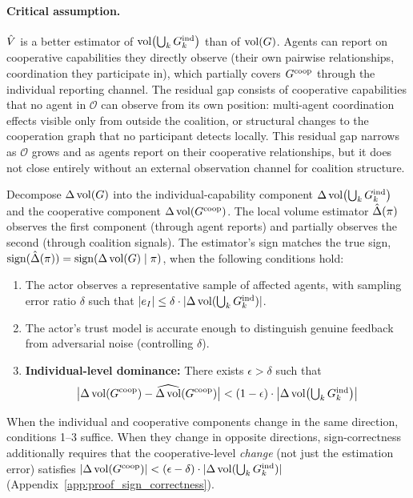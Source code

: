 \paragraph{Critical assumption.} $\hat{V}$ is a better estimator of
$\operatorname{vol}\bigl(\bigcup_k G_{k}^{\mathrm{ind}}\bigr)$ than of $\operatorname{vol}(G)$. Agents can report on
cooperative capabilities they directly observe (their own pairwise
relationships, coordination they participate in), which partially covers
$G^{\mathrm{coop}}$ through the individual reporting channel. The residual gap consists of
cooperative capabilities that no agent in $\mathcal{O}$ can observe from its
own position: multi-agent coordination effects visible only from outside the
coalition, or structural changes to the cooperation graph that no participant
detects locally. This residual gap narrows as $\mathcal{O}$ grows and as agents
report on their cooperative relationships, but it does not close entirely
without an external observation channel for coalition structure.


\begin{proposition}
\label{prop:sign_correctness}
Decompose $\Delta \operatorname{vol}(G)$ into the individual-capability component $\Delta
    \operatorname{vol}\bigl(\bigcup_k G_{k}^{\mathrm{ind}}\bigr)$ and the cooperative component $\Delta
    \operatorname{vol}(G^{\mathrm{coop}})$. The local volume estimator $\hat{\Delta}(\pi)$ observes the
    first component (through agent reports) and partially observes the second
    (through coalition signals). The estimator's sign matches the true sign,
    $\operatorname{sign}(\hat{\Delta}(\pi)) = \operatorname{sign}(\Delta \operatorname{vol}(G) \mid \pi)$, when the
    following conditions hold:
\begin{enumerate}
\item The actor observes a representative sample of affected agents, with
  sampling error ratio $\delta$ such that $|e_I| \leq \delta \cdot
  |\Delta \operatorname{vol}(\bigcup_k G_{k}^{\mathrm{ind}})|$.
\item The actor's trust model is accurate enough to distinguish genuine
  feedback from adversarial noise (controlling $\delta$).
\item \textbf{Individual-level dominance:} There exists $\epsilon > \delta$
  such that
\begin{equation}
\label{eq:sign_preservation}
\bigl|\Delta \operatorname{vol}(G^{\mathrm{coop}}) - \widehat{\Delta \operatorname{vol}}(G^{\mathrm{coop}})\bigr| < (1 - \epsilon) \cdot \bigl|\Delta \operatorname{vol}\bigl(\textstyle\bigcup_k G_{k}^{\mathrm{ind}}\bigr)\bigr|
\end{equation}
\end{enumerate}
When the individual and cooperative components change in the same direction,
    conditions 1--3 suffice. When they change in opposite directions,
    sign-correctness additionally requires that the cooperative-level
    \emph{change} (not just the estimation error) satisfies
    $|\Delta \operatorname{vol}(G^{\mathrm{coop}})| < (\epsilon - \delta) \cdot
    |\Delta \operatorname{vol}(\bigcup_k G_{k}^{\mathrm{ind}})|$
    (Appendix~\ref{app:proof_sign_correctness}).
\end{proposition}

